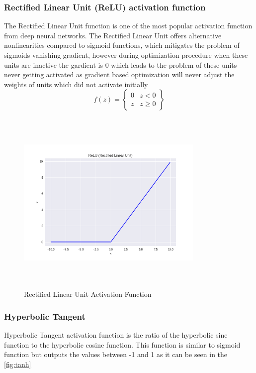\subsubsection*{Rectified Linear Unit (ReLU) activation function}
The Rectified Linear Unit function is one of the most popular activation function from deep neural networks. The Rectified Linear Unit offers alternative nonlinearities compared to sigmoid functions, which mitigates the problem of sigmoids vanishing gradient, however during optimization procedure when these units are inactive the gardient is $0$ which leads to the problem of these units never getting activated as gradient based optimization will never adjust the weights of units which did not activate initially \cite{maas2013rectifier}\\
\begin{equation}\label{eq:ReLU}
f(z) = \begin{Bmatrix}
0 & z < 0 \\ 
z & z \geq 0 
\end{Bmatrix}
\end{equation}
\begin{figure}[h]
\centering
\includegraphics[width=9cm, height=9cm, keepaspectratio]{pics/ReLU_10.png}
\caption{Rectified Linear Unit Activation Function}
\label{fig:ReLU}
\end{figure} 

\subsubsection*{Hyperbolic Tangent}
Hyperbolic Tangent activation function is the ratio of the hyperbolic sine function to the hyperbolic cosine function. This function is similar to sigmoid function but outputs the values between -1 and 1 as it can be seen in the \ref{fig:tanh} 

